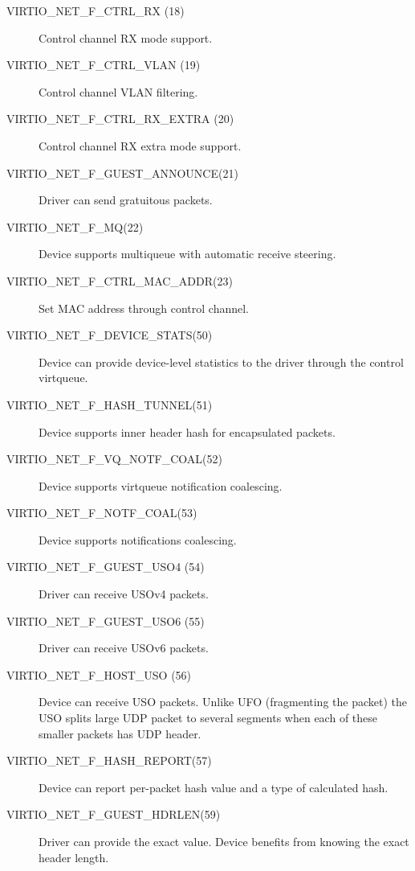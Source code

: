 \begin{description}
\item[VIRTIO_NET_F_CTRL_RX (18)] Control channel RX mode support.

\item[VIRTIO_NET_F_CTRL_VLAN (19)] Control channel VLAN filtering.

\item[VIRTIO_NET_F_CTRL_RX_EXTRA (20)]	Control channel RX extra mode support.

\item[VIRTIO_NET_F_GUEST_ANNOUNCE(21)] Driver can send gratuitous
    packets.

\item[VIRTIO_NET_F_MQ(22)] Device supports multiqueue with automatic
    receive steering.

\item[VIRTIO_NET_F_CTRL_MAC_ADDR(23)] Set MAC address through control
    channel.

\item[VIRTIO_NET_F_DEVICE_STATS(50)] Device can provide device-level statistics
    to the driver through the control virtqueue.

\item[VIRTIO_NET_F_HASH_TUNNEL(51)] Device supports inner header hash for encapsulated packets.

\item[VIRTIO_NET_F_VQ_NOTF_COAL(52)] Device supports virtqueue notification coalescing.

\item[VIRTIO_NET_F_NOTF_COAL(53)] Device supports notifications coalescing.

\item[VIRTIO_NET_F_GUEST_USO4 (54)] Driver can receive USOv4 packets.

\item[VIRTIO_NET_F_GUEST_USO6 (55)] Driver can receive USOv6 packets.

\item[VIRTIO_NET_F_HOST_USO (56)] Device can receive USO packets. Unlike UFO
 (fragmenting the packet) the USO splits large UDP packet
 to several segments when each of these smaller packets has UDP header.

\item[VIRTIO_NET_F_HASH_REPORT(57)] Device can report per-packet hash
    value and a type of calculated hash.

\item[VIRTIO_NET_F_GUEST_HDRLEN(59)] Driver can provide the exact 
    value. Device benefits from knowing the exact header length.


\end{description}
